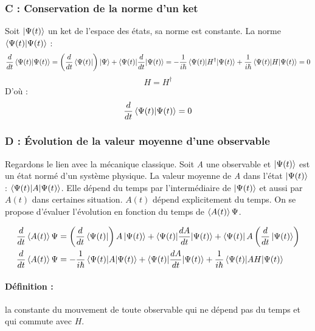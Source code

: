 \documentclass[12pt,a4paper,titlepage]{book}
\begin{document}
\subsubsection{C : Conservation de la norme d'un ket}
Soit $\ket{\Psi (t)}$ un ket de l'espace des états, sa norme est constante. La norme $\braket{\Psi (t) | \Psi (t)}$ :
\begin{equation*}
\frac{d}{dt} \braket{\Psi (t) | \Psi (t)} = \left( \frac{d}{dt} \bra{\Psi (t)} \right) \ket\Psi + \braket{\Psi (t) | \frac{d}{dt} | \Psi (t)} = -\frac{1}{i \hbar} \braket{\Psi (t) |H^\dagger | \Psi (t)} + \frac{1}{i \hbar} \braket{\Psi (t) |H| \Psi (t)} = 0
\end{equation*}
\begin{equation*}
H = H^\dagger
\end{equation*}
D'où :
\begin{equation*}
\frac{d}{dt} \braket{\Psi (t) | \Psi (t)} = 0
\end{equation*}
\subsubsection{D : Évolution de la valeur moyenne d'une observable}
Regardons le lien avec la mécanique classique. Soit \textit{A} une observable et $\ket{\Psi (t)}$ est un état normé d'un système physique. La valeur moyenne de \textit{A} dans l'état $\ket{\Psi (t)}$ : $\braket{\Psi (t) |A| \Psi (t)}$. Elle dépend du temps par l'intermédiaire de $\ket{\Psi (t)}$ et aussi par $A(t)$ dans certaines situation. $A(t)$ dépend explicitement du temps. On se propose d'évaluer l'évolution en fonction du temps de $\braket{A(t)} \Psi$.

\begin{align*}
\frac{d}{dt} \braket{A(t)} \Psi &= \left(\frac{d}{dt} \bra{\Psi (t)} \right) A \ket{\Psi (t)} + \braket{\Psi (t) | \frac{dA}{dt} | \Psi (t)} + \bra{\Psi (t)} A \left( \frac{d}{dt} \ket{\Psi (t)} \right)\\
\frac{d}{dt} \braket{A(t)} \Psi &= - \frac{1}{i \hbar} \braket{\Psi (t) |A| \Psi (t)} + \braket{\Psi (t) |\frac{dA}{dt}| \Psi (t)} + \frac{1}{i \hbar} \braket{\Psi (t) |AH| \Psi (t)}
\end{align*}

\paragraph*{Définition :}

la constante du mouvement de toute observable qui ne dépend pas du temps et qui commute avec $H$.
\end{document}
